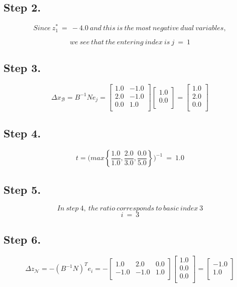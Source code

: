 \documentclass [12pt] {article}
\begin{document}
\subsection{Step 2.}
\[
Since\ z_1^*\ = \ -4.0\ and\ this\ is\ the\ most\ negative\ dual\ variables,
\]

\[
we\ see\ that\ the\ entering\ index\ is\  j\ =\ 1
\]
\subsection{Step 3.}
\[
\Delta x_{\mathcal B} = B^{-1} N e_j =
\begin{bmatrix}
1.0 & -1.0 \\ 2.0 & -1.0 \\ 0.0 & 1.0 \\ 
\end{bmatrix}
\begin{bmatrix}
1.0 \\ 0.0 \\ 
\end{bmatrix}
= \begin{bmatrix}
1.0 \\ 2.0 \\ 0.0 \\ 
\end{bmatrix}
\]
\subsection{Step 4.}
\[
t =\Bigg(
max \left\{\frac{1.0}{1.0},\frac{2.0}{3.0},\frac{0.0}{5.0}\right\}
\Bigg)^{-1}\ =\ 1.0
\]
\subsection{Step 5.}
\[
In\ step\ 4, \ the\ ratio\ corresponds\ to\ basic\ index\ 3
\]
\[
i\ = \ 3
\]
\subsection{Step 6.}
\[
\Delta z_{\mathcal N}= -( B^{-1} N )^{T}e_i = -\begin{bmatrix}
1.0 & 2.0 & 0.0 \\ -1.0 & -1.0 & 1.0 \\ 
\end{bmatrix}
\begin{bmatrix}
1.0 \\ 0.0 \\ 0.0 \\ 
\end{bmatrix}
= \begin{bmatrix}
-1.0 \\ 1.0 \\ 
\end{bmatrix}
\]
\end{document}
